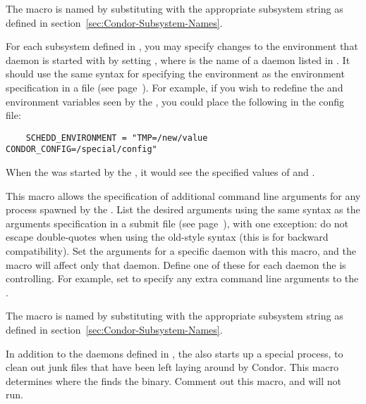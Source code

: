 \begin{description}
  The macro is named by substituting 
  with the appropriate subsystem string as defined in
  section~\ref{sec:Condor-Subsystem-Names}.

\item[\Macro{DAEMONNAME\_ENVIRONMENT}] \label{param:DaemonNameEnvironment}
  For each subsystem defined in , you may specify
  changes to the environment that daemon is started with by setting
  , where  is the name of
  a daemon listed in . It should use the same syntax
  for specifying the environment as the environment specification in
  a  file (see page~\pageref{man-condor-submit-environment}).
  For example, if you wish to redefine the
   and  environment variables seen by the
  , you could place the following in the config file:
  \begin{verbatim}
    SCHEDD_ENVIRONMENT = "TMP=/new/value CONDOR_CONFIG=/special/config"
  \end{verbatim}
  When the  was started by the , it would
  see the specified values of  and .

\item[\MacroB{<SUBSYS>\_ARGS}] \label{param:SubsysArgs}
  This macro allows
  the specification of additional command line arguments for any
  process spawned by the .  List the desired arguments
  using the same syntax as the arguments specification in a
   submit file (see
  page~\pageref{man-condor-submit-arguments}), with one exception: do
  not escape double-quotes when using the old-style syntax (this is
  for backward compatibility).  Set the arguments for a specific
  daemon with this macro, and the macro will affect only that
  daemon. Define one of these for each daemon the  is
  controlling.  For example, set  to specify
  any extra command line arguments to the .

  The macro is named by substituting 
  with the appropriate subsystem string as defined in
  section~\ref{sec:Condor-Subsystem-Names}.

\item[\Macro{PREEN}] \label{param:Preen} In addition to the daemons
  defined in , the  also starts up
  a special process,  to clean out junk files that have
  been left laying around by Condor.  This macro determines where the
   finds the  binary.
  Comment out this macro, and  will not run.


\end{description}
